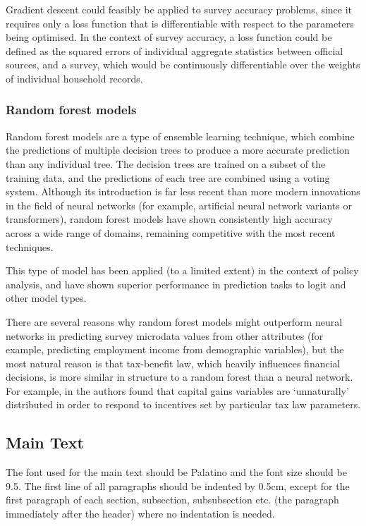 \documentclass[10pt,journal,compsoc]{IEEEtran}
\begin{document}
Gradient descent could feasibly be applied to survey accuracy problems, since it requires only a loss function that is differentiable with respect to the parameters being optimised. In the context of survey accuracy, a loss function could be defined as the squared errors of individual aggregate statistics between official sources, and a survey, which would be continuously differentiable over the weights of individual household records.

\subsubsection{Random forest models}

Random forest models are a type of ensemble learning technique, which combine the predictions of multiple decision trees to produce a more accurate prediction than any individual tree.\cite{random_forests} The decision trees are trained on a subset of the training data, and the predictions of each tree are combined using a voting system. Although its introduction is far less recent than more modern innovations in the field of neural networks (for example, artificial neural network variants\cite{anns} or transformers\cite{transformers}), random forest models have shown consistently high accuracy across a wide range of domains, remaining competitive with the most recent techniques.

This type of model has been applied (to a limited extent) in the context of policy analysis, and have shown superior performance in prediction tasks to logit and other model types.\cite{ecb}

There are several reasons why random forest models might outperform neural networks in predicting survey microdata values from other attributes (for example, predicting employment income from demographic variables), but the most natural reason is that tax-benefit law, which heavily influences financial decisions, is more similar in structure to a random forest than a neural network. For example, in \cite{cg_bunching} the authors found that capital gains variables are `unnaturally' distributed in order to respond to incentives set by particular tax law parameters.

\subsection{Main Text}
The font used for the main text should be Palatino and the font size should be 9.5. The first line of all paragraphs should be indented by 0.5cm, except for the first paragraph of each section, subsection, subsubsection etc. (the paragraph immediately after the header) where no indentation is needed.
\end{document}
